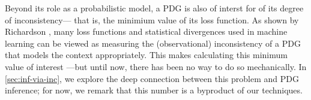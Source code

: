 \documentclass{article}
\begin{document}
Beyond its role as a probabilistic model,
    a PDG is also of interst for of its degree of inconsistency---%
    that is, the minimium value of its loss function. 
As shown by Richardson
    ,
    many loss functions and statistical divergences
    used in machine learning
can be viewed as measuring 
the (observational) inconsistency
of a PDG that models the context appropriately.
This makes calculating this minimum value of interest%
---but until now, there has been no way to do so mechanically.
In \cref{sec:inf-via-inc}, we explore the
deep connection between this problem and PDG inference; 
for now, we remark that this number is a byproduct of our techniques.
\end{document}
